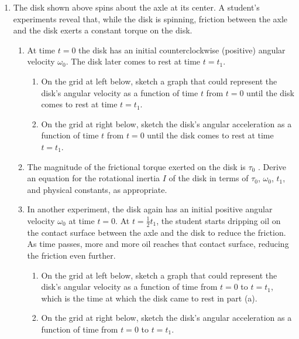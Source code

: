 \documentclass{../../../oss-apphys}
\begin{document}
\begin{enumerate}
\item The disk shown above spins about the axle at its center. A student's
  experiments reveal that, while the disk is spinning, friction between the
  axle and the disk exerts a constant torque on the disk.
  \begin{enumerate}[leftmargin=15pt]
  \item At time $t=0$ the disk has an initial counterclockwise (positive)
    angular velocity $\omega_0$. The disk later comes to rest at time $t=t_1$.
    \begin{enumerate}
    \item On the grid at left below, sketch a graph that could represent the
      disk's angular velocity as a function of time $t$ from $t=0$ until the
      disk comes to rest at time $t=t_1$.   
    \item On the grid at right below, sketch the disk's angular acceleration as
      a function of time $t$ from $t=0$ until the disk comes to rest at time
      $t=t_1$.   
    \end{enumerate}
  \item The magnitude of the frictional torque exerted on the disk is
    $\tau_0$ . Derive an equation for the rotational inertia $I$ of the disk in
    terms of $\tau_0$, $\omega_0$, $t_1$, and physical constants, as
    appropriate.
    \vspace{.75in}
    \newpage
    
  \item In another experiment, the disk again has an initial positive angular
    velocity $\omega_0$ at time $t=0$. At $\displaystyle t=\frac12t_1$, the
    student starts dripping oil on the contact surface between the axle and the
    disk to reduce the friction. As time passes, more and more oil reaches that
    contact surface, reducing the friction even further.
    \begin{enumerate}
    \item On the grid at left below, sketch a graph that could represent the
      disk's angular velocity as a function of time from $t=0$ to $t=t_1$,
      which is the time at which the disk came to rest in part (a).
    \item On the grid at right below, sketch the disk's angular acceleration
      as a function of time from $t=0$ to $t=t_1$.
    \end{enumerate}
    

\end{enumerate}
\end{enumerate}
\end{document}
